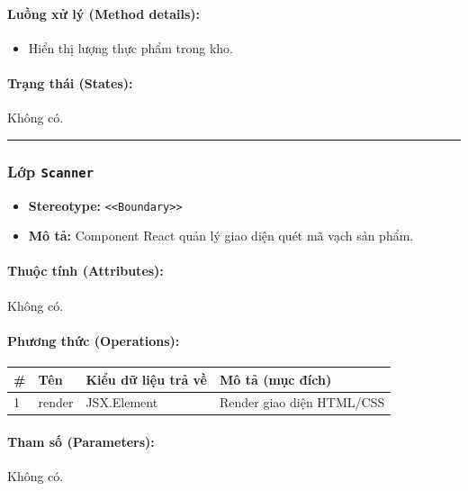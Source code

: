 \documentclass[12pt,a4paper]{article}
\begin{document}
\paragraph{Luồng xử lý (Method details):}
\begin{itemize}[leftmargin=*]
    \item Hiển thị lượng thực phẩm trong kho.
\end{itemize}


\paragraph{Trạng thái (States):}
Không có.

\vskip 0.5cm
\noindent\rule{\textwidth}{0.5pt}
\vskip 0.5cm

\subsubsection{Lớp \texttt{Scanner}}

\begin{itemize}[leftmargin=*]
    \item \textbf{Stereotype:} \texttt{\textless{}\textless{}Boundary\textgreater{}\textgreater{}}
    \item \textbf{Mô tả:} Component React quản lý giao diện quét mã vạch sản phẩm.
\end{itemize}

\paragraph{Thuộc tính (Attributes):}
Không có.

\paragraph{Phương thức (Operations):}
\begin{longtable}{|p{0.6cm}|p{5.0cm}|p{2.8cm}|p{5.4cm}|}
\hline
\textbf{\#} & \textbf{Tên} & \textbf{Kiểu dữ liệu trả về} & \textbf{Mô tả (mục đích)} \\ \hline
\endhead
1 & render & JSX.Element & Render giao diện HTML/CSS \\ \hline
\end{longtable}

\paragraph{Tham số (Parameters):}
Không có.
\end{document}
